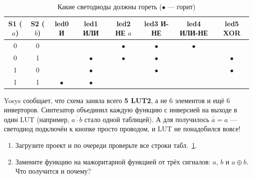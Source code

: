 
\begin{table}[H]
\centering
\caption{Какие светодиоды должны гореть ($\bullet$ --- горит)}
\label{tab:gates}
\begin{tabular}{cc|cccccc}
\toprule
S1 ($a$) & S2 ($b$) & led0 И & led1 ИЛИ & led2 НЕ $a$ & led3 И-НЕ & led4 ИЛИ-НЕ & led5 XOR \\
\midrule
0 & 0 &           &           & $\bullet$ & $\bullet$ & $\bullet$ &           \\
0 & 1 &           & $\bullet$ & $\bullet$ & $\bullet$ &           & $\bullet$ \\
1 & 0 &           & $\bullet$ &           & $\bullet$ &           & $\bullet$ \\
1 & 1 & $\bullet$ & $\bullet$ &           &           &           &           \\
\bottomrule
\end{tabular}
\end{table}

\begin{infobox}
Yosys сообщает, что схема заняла всего \textbf{5 LUT2}, а не 6 элементов
и ещё 6 инверторов. Синтезатор объединил каждую функцию с инверсией на выходе в
один LUT (например, $\overline{a\cdot b}$ стало одной таблицей). А для
 получилось $\overline{\overline{a}} = a$ --- светодиод подключён
к кнопке просто проводом, и LUT не понадобился вовсе!
\end{infobox}

\begin{taskbox}
\begin{enumerate}
  \item Загрузите проект и по очереди проверьте все строки
        табл.~\ref{tab:gates}.
  \item Замените функцию на  мажоритарной функцией от трёх
        сигналов: $a$, $b$ и $a \oplus b$. Что получится и почему?
\end{enumerate}
\end{taskbox}

